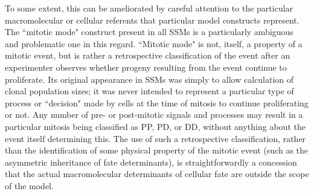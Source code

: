 \documentclass[10pt,letterpaper]{article}
\begin{document}
To some extent, this can be ameliorated by careful attention to the particular macromolecular or cellular referents that particular model constructs represent. The ``mitotic mode" construct present in all SSMs is a particularly ambiguous and problematic one in this regard. ``Mitotic mode" is not, itself, a property of a mitotic event, but is rather a retrospective classification of the event after an experimenter observes whether progeny resulting from the event continue to proliferate. Its original appearance in SSMs was simply to allow calculation of clonal population sizes; it was never intended to represent a particular type of process or ``decision" made by cells at the time of mitosis to continue proliferating or not. Any number of pre- or post-mitotic signals and processes may result in a particular mitosis being classified as PP, PD, or DD, without anything about the event itself determining this. The use of such a retrospective classification, rather than the identification of some physical property of the mitotic event (such as the asymmetric inheritance of fate determinants), is straightforwardly a concession that the actual macromolecular determinants of cellular fate are outside the scope of the model.
\end{document}
